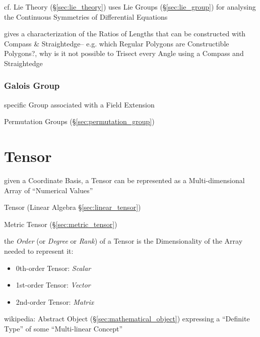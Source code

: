 \begin{itemize}
cf. Lie Theory (\S\ref{sec:lie_theory}) uses Lie Groups
(\S\ref{sec:lie_group}) for analysing the Continuous Symmetries of
Differential Equations

gives a characterization of the Ratios of Lengths that can be constructed with
Compass \& Straightedge-- e.g. which Regular Polygons are Constructible
Polygons?, why is it not possible to Trisect every Angle using a Compass and
Straightedge



\subsubsection{Galois Group}\label{sec:galois_group}

specific Group associated with a Field Extension %

Permutation Groups (\S\ref{sec:permutation_group})



\section{Tensor}\label{sec:tensor}

given a Coordinate Basis, a Tensor can be represented as a
Multi-dimensional Array of ``Numerical Values'' %


\fist Tensor (Linear Algebra \S\ref{sec:linear_tensor})

\fist Metric Tensor (\S\ref{sec:metric_tensor})

the \emph{Order} (or \emph{Degree} or \emph{Rank}) of a Tensor is the
Dimensionality of the Array needed to represent it:

\begin{itemize}
  \item 0th-order Tensor: \emph{Scalar}
  \item 1st-order Tensor: \emph{Vector}
  \item 2nd-order Tensor: \emph{Matrix}
\end{itemize}

wikipedia: Abstract Object (\S\ref{sec:mathematical_object})
expressing a ``Definite Type'' of some ``Multi-linear Concept''


\end{itemize}

